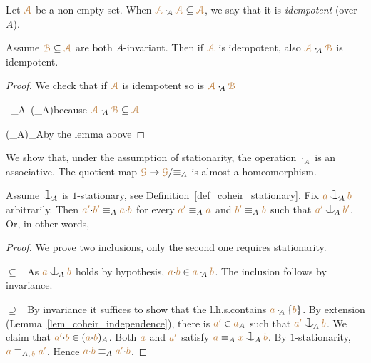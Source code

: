 \documentclass[creche.tex]{subfiles}
\begin{document}
Let ${\color{brown}\EuScript A}$ be a non empty set.
When ${\color{brown}\EuScript A}\cdot_{\!A}{\color{brown}\EuScript A}\subseteq{\color{brown}\EuScript A}$, we say that it is \emph{idempotent\/} (over $A$).

\begin{corollary}\label{corol_min_idempotent}
Assume ${\color{brown}\EuScript B}\subseteq{\color{brown}\EuScript A}$ are both $A$-invariant.
Then if ${\color{brown}\EuScript A}$ is idempotent,
also ${\color{brown}\EuScript A}\cdot_{\!A}{\color{brown}\EuScript B}$ is idempotent.
\end{corollary}
\begin{proof}
We check that if ${\color{brown}\EuScript A}$ is idempotent so is ${\color{brown}\EuScript A}\cdot_{\!A}{\color{brown}\EuScript B}$

    {\subseteq}
    {\mrA\ \cdot_{\!A}\ \big(\mrA\cdot_{\!A}\mrB\big)}\hfill because ${\color{brown}\EuScript A}\cdot_{\!A}{\color{brown}\EuScript B}\subseteq{\color{brown}\EuScript A}$

\ceq{}
    {\subseteq}
    {\big(\mrA\cdot_{\!A}\mrA\big)\cdot_{\!A}\mrB}\hfill by the lemma above

\end{proof}

We show that, under the assumption of stationarity,
the operation $\cdot_{\!A}$ is an associative.
The quotient map ${\color{brown}\EuScript G}\to{\color{brown}\EuScript G}/{\equiv_A}$ is almost a homeomorphism.


\begin{proposition}\label{prop_orbits_main}
Assume $\cnonfork_{\!A}$ is $1$-stationary,
see Definition~\ref{def_coheir_stationary}.
Fix ${\mr a}\cnonfork_{\!A}{\mr b}$ arbitrarily.
Then ${\color{brown} a'}{\cdot}{\color{brown} b'}\equiv_A{\color{brown} a}{\cdot}{\color{brown} b}$ for every 
${\color{brown} a'}\equiv_A{\color{brown} a}$ and  ${\color{brown} b'}\equiv_A{\color{brown} b}$ such that
${\mr a'}\cnonfork_{\!A}{\mr b'}$.
Or, in other words,

\end{proposition}
\begin{proof} 
We prove two inclusions,
only the second one requires stationarity.

$\subseteq$ \ As ${\mr a}\cnonfork_{\!A}{\mr b}$ holds by hypothesis,
${\color{brown} a}{\cdot}{\color{brown} b}\in{\color{brown}a}\cdot_{\!A}{\color{brown} b}$.
The inclusion follows by invariance.

$\supseteq$ \ By invariance it suffices to show that 
the l.h.s.\@ contains ${\color{brown} a}\cdot_{\!A}\{{\color{brown} b}\}$.
By extension (Lemma~\ref{lem_coheir_independence}), there is ${\color{brown} a'}\in{\color{brown}a}_A$ such that ${\mr a'}\cnonfork_{\!A}{\mr b}$.
We claim that ${\color{brown} a'}{\cdot}{\color{brown} b}\in({\color{brown} a}{\cdot}{\color{brown} b})_A$.
Both ${\color{brown} a}$ and ${\color{brown} a'}$ satisfy ${\mr a}\equiv_A{\mr x}\cnonfork_{\!A}{\mr b}$.
By $1$-stationarity,
${\color{brown} a}\equiv_{A,\,{\color{brown} b}}{\color{brown} a'}$.
Hence ${\color{brown} a}{\cdot}{\color{brown} b}\equiv_A{\color{brown} a'}{\cdot}{\color{brown} b}$.
\end{proof}
\end{document}
